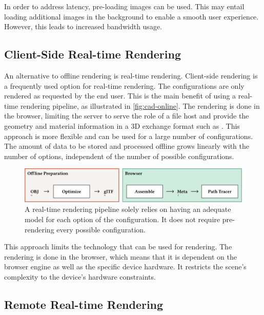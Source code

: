 In order to address latency, pre-loading images can be used. This may entail loading additional images in the background to enable a smooth user experience. However, this leads to increased bandwidth usage.

\subsection*{Client-Side Real-time Rendering}

An alternative to offline rendering is real-time rendering. Client-side rendering is a frequently used option for real-time rendering. The configurations are only rendered as requested by the end user. This is the main benefit of using a real-time rendering pipeline, as illustrated in \autoref{fig:cad-online}. The rendering is done in the browser, limiting the server to serve the role of a file host and provide the geometry and material information in a 3D exchange format such as . This approach is more flexible and can be used for a large number of configurations. The amount of data to be stored and processed offline grows linearly with the number of options, independent of the number of possible configurations.

\begin{figure}[H]
  \includegraphics[width=\columnwidth]{resources/cad-pipeline-online.png}
  \caption{A real-time rendering pipeline solely relies on having an adequate model for each option of the configuration. It does not require pre-rendering every possible configuration.}
  \label{fig:cad-online}
\end{figure}

This approach limits the technology that can be used for rendering. The rendering is done in the browser, which means that it is dependent on the browser engine as well as the specific device hardware. It restricts the scene's complexity to the device's hardware constraints.

\subsection*{Remote Real-time Rendering}

